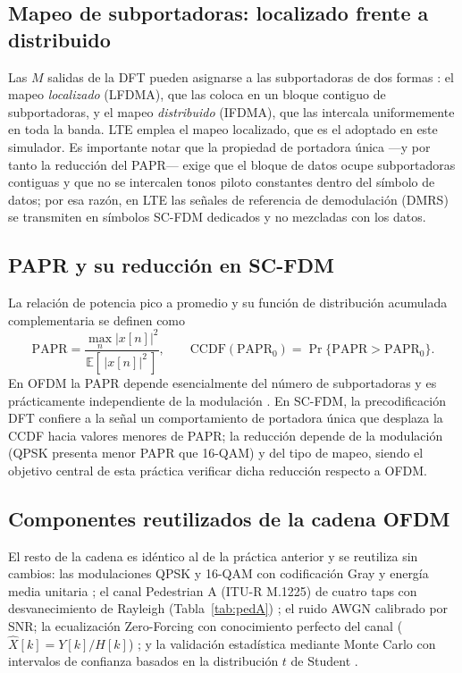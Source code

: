 \documentclass[conference,onecolumn]{IEEEtran}
\begin{document}
\subsection{Mapeo de subportadoras: localizado frente a distribuido}

Las $M$ salidas de la DFT pueden asignarse a las subportadoras de dos formas \cite{myung2006scfdma}: el mapeo \emph{localizado} (LFDMA), que las coloca en un bloque contiguo de subportadoras, y el mapeo \emph{distribuido} (IFDMA), que las intercala uniformemente en toda la banda. LTE emplea el mapeo localizado, que es el adoptado en este simulador. Es importante notar que la propiedad de portadora \'unica ---y por tanto la reducci\'on del PAPR--- exige que el bloque de datos ocupe subportadoras contiguas y que no se intercalen tonos piloto constantes dentro del s\'imbolo de datos; por esa raz\'on, en LTE las se\~nales de referencia de demodulaci\'on (DMRS) se transmiten en s\'imbolos SC-FDM dedicados y no mezcladas con los datos.

\subsection{PAPR y su reducci\'on en SC-FDM}

La relaci\'on de potencia pico a promedio y su funci\'on de distribuci\'on acumulada complementaria se definen como
\begin{equation}
\mathrm{PAPR}=\frac{\max_n |x[n]|^2}{\mathbb{E}[\,|x[n]|^2\,]}, \qquad \mathrm{CCDF}(\mathrm{PAPR}_0)=\Pr\{\mathrm{PAPR}>\mathrm{PAPR}_0\}.
\end{equation}
En OFDM la PAPR depende esencialmente del n\'umero de subportadoras y es pr\'acticamente independiente de la modulaci\'on \cite{han2005}. En SC-FDM, la precodificaci\'on DFT confiere a la se\~nal un comportamiento de portadora \'unica que desplaza la CCDF hacia valores menores de PAPR; la reducci\'on depende de la modulaci\'on (QPSK presenta menor PAPR que 16-QAM) y del tipo de mapeo, siendo el objetivo central de esta pr\'actica verificar dicha reducci\'on respecto a OFDM.

\subsection{Componentes reutilizados de la cadena OFDM}

El resto de la cadena es id\'entico al de la pr\'actica anterior y se reutiliza sin cambios: las modulaciones QPSK y 16-QAM con codificaci\'on Gray y energ\'ia media unitaria \cite{proakis2008digital}; el canal Pedestrian A (ITU-R M.1225) de cuatro taps con desvanecimiento de Rayleigh (Tabla~\ref{tab:pedA}) \cite{ituR1225,rappaport2002}; el ruido AWGN calibrado por SNR; la ecualizaci\'on Zero-Forcing con conocimiento perfecto del canal ($\hat{X}[k]=Y[k]/H[k]$) \cite{goldsmith2005wireless}; y la validaci\'on estad\'istica mediante Monte Carlo con intervalos de confianza basados en la distribuci\'on $t$ de Student \cite{montgomery2011}.
\end{document}
